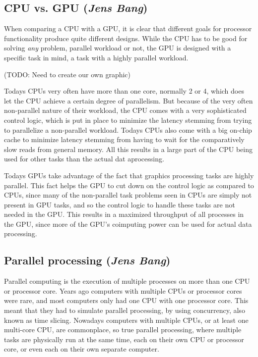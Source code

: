 \subsection{CPU vs. GPU (\textit{Jens Bang})}
When comparing a CPU with a GPU, it is clear that different goals for processor functionality produce quite different designs. While the CPU has to be good for solving \emph{any} problem, parallel workload or not, the GPU is designed with a specific task in mind, a task with a highly parallel workload.


(TODO: Need to create our own graphic)

Todays CPUs very often have more than one core, normally 2 or 4, which does let the CPU achieve a certain degree of parallelism. But because of the very often non-parallel nature of their workload, the CPU comes with a very sophisticated control logic, which is put in place to minimize the latency stemming from trying to parallelize a non-parallel workload. Todays CPUs also come with a big on-chip cache to minimize latency stemming from having to wait for the comparatively slow reads from general memory. All this results in a large part of the CPU being used for other tasks than the actual dat aprocessing.

Todays GPUs take advantage of the fact that graphics processing tasks are highly parallel. This fact helps the GPU to cut down on the control logic as compared to CPUs, since many of the non-parallel task problems seen in CPUs are simply not present in GPU tasks, and so the control logic to handle these tasks are not needed in the GPU. This results in a maximized throughput of all processes in the GPU, since more of the GPU's coimputing power can be used for actual data processing.

\subsection{Parallel processing (\textit{Jens Bang})}

Parallel computing is the execution of multiple processes on more than one CPU or processor core. Years ago computers with multiple CPUs or processor cores were rare, and most computers only had one CPU with one processor core. This meant that they had to simulate parallel processing, by using concurrency, also known as time slicing. Nowadays computers with multiple CPUs, or at least one multi-core CPU, are commonplace, so true parallel processing, where multiple tasks are physically run at the same time, each on their own CPU or processor core, or even each on their own separate computer.

